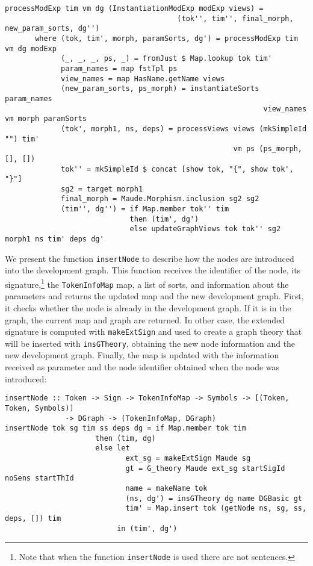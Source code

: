 \begin{itemize}
{\codesize
\begin{verbatim}
processModExp tim vm dg (InstantiationModExp modExp views) = 
                                        (tok'', tim'', final_morph, new_param_sorts, dg'')
       where (tok, tim', morph, paramSorts, dg') = processModExp tim vm dg modExp
             (_, _, _, ps, _) = fromJust $ Map.lookup tok tim'
             param_names = map fstTpl ps
             view_names = map HasName.getName views
             (new_param_sorts, ps_morph) = instantiateSorts param_names 
                                                            view_names vm morph paramSorts
             (tok', morph1, ns, deps) = processViews views (mkSimpleId "") tim' 
                                                     vm ps (ps_morph, [], [])
             tok'' = mkSimpleId $ concat [show tok, "{", show tok', "}"]
             sg2 = target morph1
             final_morph = Maude.Morphism.inclusion sg2 sg2
             (tim'', dg'') = if Map.member tok'' tim
                             then (tim', dg')
                             else updateGraphViews tok tok'' sg2 morph1 ns tim' deps dg'
\end{verbatim}
}

\end{itemize}

We present the function \verb"insertNode" to describe how the nodes are
introduced into the development graph. This function receives the
identifier of the node, its signature,\footnote{Note that when the
function \texttt{insertNode} is used there are not sentences.}
the \verb"TokenInfoMap" map, a list of sorts, and information
about the parameters and returns the updated map and the new development
graph. First, it checks whether
the node is already in the development graph. If it is in the graph,
the current map and graph are returned. In other case, the extended
signature is computed with \verb"makeExtSign" and used to create a graph
theory that will be inserted with \verb"insGTheory", obtaining the new
node information and the new development graph. Finally, the map is
updated with the information received as parameter and the node identifier
obtained when the node was introduced:

{\codesize
\begin{verbatim}
insertNode :: Token -> Sign -> TokenInfoMap -> Symbols -> [(Token, Token, Symbols)]
              -> DGraph -> (TokenInfoMap, DGraph)
insertNode tok sg tim ss deps dg = if Map.member tok tim
                     then (tim, dg)
                     else let
                            ext_sg = makeExtSign Maude sg
                            gt = G_theory Maude ext_sg startSigId noSens startThId
                            name = makeName tok
                            (ns, dg') = insGTheory dg name DGBasic gt
                            tim' = Map.insert tok (getNode ns, sg, ss, deps, []) tim
                          in (tim', dg')
\end{verbatim}
}

